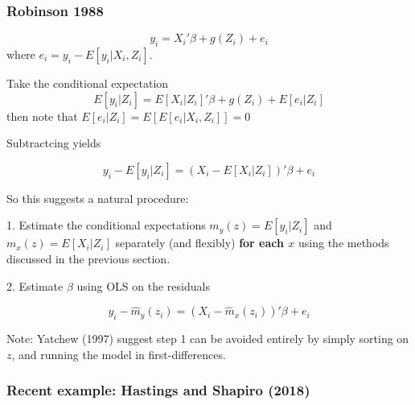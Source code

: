 \begin{frame}[allowframebreaks]
  \frametitle{Robinson 1988}
  $$ y_i = X_i'\beta + g(Z_i) + e_i $$ 
  where $e_i = y_i - E[y_i | X_i,Z_i]$. 
  
  Take the conditional expectation
  $$ E[y_i | Z_i]  = E [X_i | Z_i]'\beta + g(Z_i) + E[e_i | Z_i] $$ 
  then note that $E[e_i | Z_i] = E[E[e_i | X_i,Z_i]] = 0$ 

  Subtractcing yields 

  $$ y_i - E[y_i | Z_i] = (X_i - E [X_i | Z_i])'\beta + e_i $$

  \framebreak 

  So this suggests a natural procedure: 

  1. Estimate the conditional expectations $m_y(z) = E[y_i | Z_i]$ and $m_x(z) = E[X_i | Z_i]$ separately (and flexibly) \textbf{for each $x$} using the methods discussed in the previous section. 

  2. Estimate $\beta$ using OLS on the residuals 
  
  $$y_i - \hat m_y(z_i) =  (X_i - \hat m_x(z_i))'\beta + e_i $$

  \pause 

  Note: Yatchew (1997) suggest step 1 can be avoided entirely by simply sorting on $z$, and running the model in first-differences. 

\end{frame}

\begin{frame}
  \frametitle{Recent example: Hastings and Shapiro (2018)}
\end{frame}

